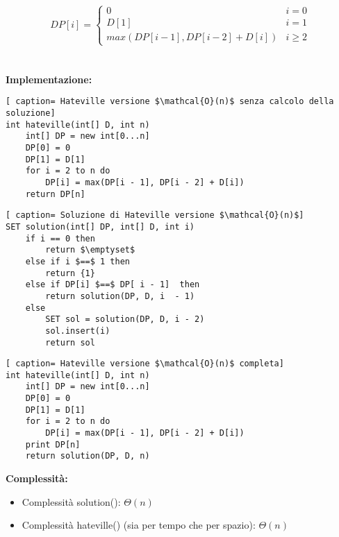 \documentclass[../cheatSheetAlgoritmi.tex]{subfiles}
\begin{document}
\begin{equation*}
  	DP[i] =\begin{cases}
    	0 & \text{$i = 0$}\\
    	D[1] & \text{$i = 1$}\\
    	max(DP[i -1], DP[i-2]+D[i]) & \text{$i \ge 2$}
  	\end{cases}
\end{equation*} \\\\
\textbf{Implementazione:}
\begin{lstlisting}[ caption= Hateville versione $\mathcal{O}(n)$ senza calcolo della soluzione]
int hateville(int[] D, int n)
	int[] DP = new int[0...n]
	DP[0] = 0
	DP[1] = D[1]
	for i = 2 to n do
		DP[i] = max(DP[i - 1], DP[i - 2] + D[i])
	return DP[n]
\end{lstlisting}

\begin{lstlisting}[ caption= Soluzione di Hateville versione $\mathcal{O}(n)$]
SET solution(int[] DP, int[] D, int i)
	if i == 0 then
		return $\emptyset$
	else if i $==$ 1 then
		return {1}
	else if DP[i] $==$ DP[ i - 1]  then
		return solution(DP, D, i  - 1)
	else
		SET sol = solution(DP, D, i - 2)
		sol.insert(i)
		return sol
\end{lstlisting}

\begin{lstlisting}[ caption= Hateville versione $\mathcal{O}(n)$ completa]
int hateville(int[] D, int n)
	int[] DP = new int[0...n]
	DP[0] = 0
	DP[1] = D[1]
	for i = 2 to n do
		DP[i] = max(DP[i - 1], DP[i - 2] + D[i])
	print DP[n]
	return solution(DP, D, n)
\end{lstlisting}
\textbf{Complessità:}  
\begin{itemize}
	\item Complessità solution(): $\Theta(n)$
	\item Complessità hateville() (sia per tempo che per spazio): $\Theta(n)$
\end{itemize}
\end{document}
